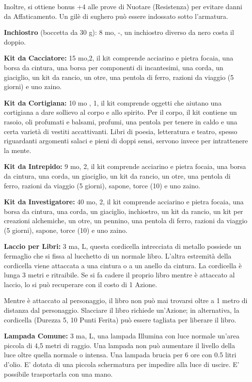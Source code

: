 \documentclass[a4paper,11pt,twoside,openany]{book}
\begin{document}
Inoltre, si ottiene bonus +4 alle prove di Nuotare (Resistenza) per evitare danni da Affaticamento. Un gilè di sughero può essere indossato sotto l'armatura.

\textbf{Inchiostro} (boccetta da 30 g): 8 mo, -, un inchiostro diverso da nero costa il doppio.

\textbf{Kit da Cacciatore:} 15 mo,2, il kit comprende acciarino e pietra focaia, una borsa da cin­tura, una borsa per componenti di incantesimi, una corda, un giaciglio, un kit da rancio, un otre, una pentola di ferro, razioni da viaggio (5 giorni) e uno zaino.

\textbf{Kit da Cortigiana:} 10 mo , 1, il kit comprende oggetti che aiutano una cortigiana a dare sollievo al corpo e allo spirito. Per il corpo, il kit contiene un rasoio, oli profumati e balsami, profumi, una pentola per tenere in caldo e una certa varietà di vestiti accattivanti. Libri di poesia, letteratura e teatro, spesso riguardanti argomenti salaci e pieni di doppi sensi, servono invece per intrattenere la mente.

\textbf{Kit da Intrepido:} 9 mo, 2, il kit comprende acciarino e pietra focaia, una borsa da cin­tura, una corda, un giaciglio, un kit da rancio, un otre, una pentola di ferro, razioni da viaggio (5 giorni), sapone, torce (10) e uno zaino.

\textbf{Kit da Investigatore:} 40 mo, 2, il kit comprende acciarino e pietra focaia, una borsa da cin­tura, una corda, un giaciglio, inchiostro, un kit da rancio, un kit per creazioni alchemiche, un otre, un pennino, una pentola di ferro, razioni da viaggio (5 giorni), sapone, torce (10) e uno zaino.

\textbf{Laccio per Libri:} 3 ma, L, questa cordicella intrecciata di metallo possiede un fermaglio che si fissa al lucchetto di un normale libro. L'altra estremità della cordicella viene attaccata a una cintura o a un anello da cintura. La cordicella è lunga 3 metri e ritraibile. Se si fa cadere il proprio libro mentre è attaccato al laccio, lo si può recuperare con il costo di 1 Azione.

Mentre è attaccato al personaggio, il libro non può mai trovarsi oltre a 1 metro di distanza dal personaggio. Slacciare il libro richiede un'Azione; in alternativa, la cordicella (Durezza 5, 10 Punti Ferita) può essere tagliata per liberare il libro.

\textbf{Lampada Comune:} 3 ma, L, una lampada Illumina con luce normale un'area piccola di 4,5 metri di raggio. Una lampada non può aumentare il livello della luce oltre quella normale o intensa. Una lampada brucia per 6 ore con 0.5 litri d'olio. E' dotata di una piccola schermatura per impedire alla luce di uscire. E' possibile trasportarla con una mano.
\end{document}
